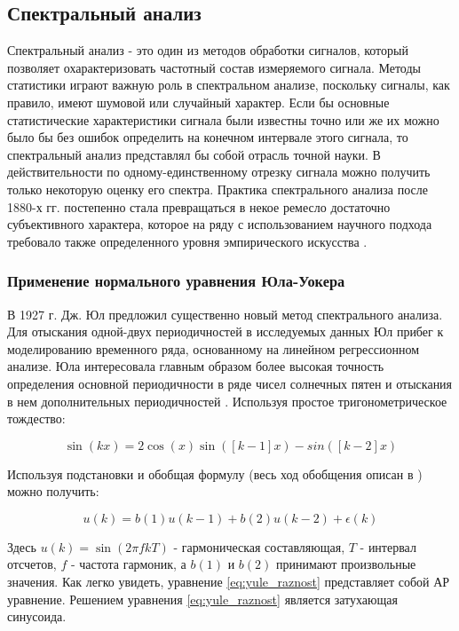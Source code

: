 \subsection{Спектральный анализ}
Спектральный анализ - это один из методов обработки сигналов, который позволяет охарактеризовать частотный состав измеряемого сигнала.
Методы статистики играют важную роль в спектральном анализе, поскольку сигналы, как правило, имеют шумовой или случайный характер. Если бы
основные статистические характеристики сигнала были известны точно или же их можно было бы без ошибок определить на конечном интервале этого
сигнала, то спектральный анализ представлял бы собой отрасль точной науки. В действительности по одному-единственному отрезку сигнала можно
получить только некоторую оценку его спектра. Практика спектрального анализа после 1880-х гг. постепенно стала превращаться в некое ремесло
достаточно субъективного характера, которое на ряду с использованием научного подхода требовало также определенного уровня эмпирического
искусства \cite{marpl_book}.

\subsubsection{Применение нормального уравнения Юла-Уокера}
В 1927 г. Дж. Юл предложил существенно новый метод спектрального анализа. Для отыскания одной-двух периодичностей в исследуемых данных Юл
прибег к моделированию временного ряда, основанному на линейном регрессионном анализе. Юла интересовала главным образом более высокая точность
определения основной периодичности в ряде чисел солнечных пятен и отыскания в нем дополнительных периодичностей \cite{marpl_book}.
Используя простое тригонометрическое тождество:
\begin{center}
\begin{equation}
	\label{eq:yule_trigonometric}
	\sin(kx)=2\cos(x)\sin([k-1]x)-sin([k-2]x)
\end{equation}
\end{center}
Используя подстановки и обобщая формулу (весь ход обобщения описан в \cite{marpl_book}) можно получить:
\begin{center}
\begin{equation}
	\label{eq:yule_raznost}
	u(k) = b(1)u(k-1) + b(2)u(k-2) + \epsilon (k)
\end{equation}
\end{center}
Здесь ${u(k) = \sin (2\pi fkT)}$ - гармоническая составляющая, ${T}$ - интервал отсчетов, ${f}$ - частота гармоник, а
${b(1)}$ и ${b(2)}$ принимают произвольные значения. Как легко увидеть, уравнение \ref{eq:yule_raznost} представляет собой АР уравнение.
Решением уравнения \ref{eq:yule_raznost} является затухающая синусоида.

